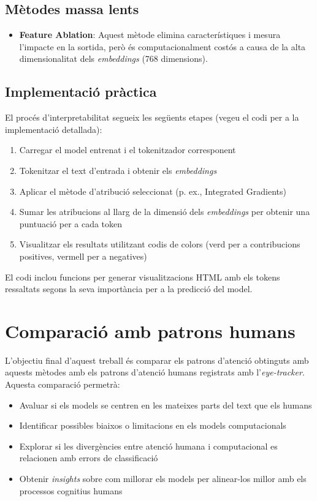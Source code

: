 \subsection{Mètodes massa lents}

\begin{itemize}
    \item \textbf{Feature Ablation}: Aquest mètode elimina característiques i mesura 
    l'impacte en la sortida, però és computacionalment costós a causa de la 
    alta dimensionalitat dels \textit{embeddings} (768 dimensions).
\end{itemize}

\subsection{Implementació pràctica}

El procés d'interpretabilitat segueix les següents etapes (vegeu el codi per a la 
implementació detallada):

\begin{enumerate}
    \item Carregar el model entrenat i el tokenitzador corresponent
    \item Tokenitzar el text d'entrada i obtenir els \textit{embeddings}
    \item Aplicar el mètode d'atribució seleccionat (p. ex., Integrated Gradients)
    \item Sumar les atribucions al llarg de la dimensió dels \textit{embeddings} per obtenir 
    una puntuació per a cada token
    \item Visualitzar els resultats utilitzant codis de colors (verd per a contribucions 
    positives, vermell per a negatives)
\end{enumerate}

El codi inclou funcions per generar visualitzacions HTML amb els tokens ressaltats segons 
la seva importància per a la predicció del model.

\section{Comparació amb patrons humans}

L'objectiu final d'aquest treball és comparar els patrons d'atenció obtinguts amb aquests mètodes amb els patrons d'atenció 
humans registrats amb l'\textit{eye-tracker}. Aquesta comparació permetrà:

\begin{itemize}
    \item Avaluar si els models se centren en les mateixes parts del text que els humans
    \item Identificar possibles biaixos o limitacions en els models computacionals
    \item Explorar si les divergències entre atenció humana i computacional es relacionen 
    amb errors de classificació
    \item Obtenir \textit{insights} sobre com millorar els models per alinear-los millor amb 
    els processos cognitius humans
\end{itemize}

